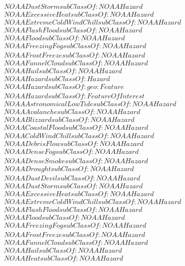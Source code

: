 \begin{align}
  NOAADustStorm subClassOf: NOAAHazard\\
  NOAAExcessiveHeat subClassOf: NOAAHazard\\
  NOAAExtremeColdWindChill subClassOf: NOAAHazard\\
  NOAAFlashFlood subClassOf: NOAAHazard\\
  NOAAFlood subClassOf: NOAAHazard\\
  NOAAFreezingFog subClassOf: NOAAHazard\\
  NOAAFrostFreeze subClassOf: NOAAHazard\\
  NOAAFunnelCloud subClassOf: NOAAHazard\\
  NOAAHail subClassOf: NOAAHazard\\
  NOAAHazard subClassOf: Hazard\\
  NOAAHazard subClassOf: geo:Feature\\
  NOAAHazard subClassOf: FeatureOfInterest\\
  NOAAAstronomicalLowTide subClassOf: NOAAHazard\\
  NOAAAvalanche subClassOf: NOAAHazard\\
  NOAABlizzard subClassOf: NOAAHazard\\
  NOAACoastalFlood subClassOf: NOAAHazard\\
  NOAAColdWindChill subClassOf: NOAAHazard\\
  NOAADebrisFlow subClassOf: NOAAHazard\\
  NOAADenseFog subClassOf: NOAAHazard\\
  NOAADenseSmoke subClassOf: NOAAHazard\\
  NOAADrought subClassOf: NOAAHazard\\
  NOAADustDevil subClassOf: NOAAHazard\\
  NOAADustStorm subClassOf: NOAAHazard\\
  NOAAExcessiveHeat subClassOf: NOAAHazard\\
  NOAAExtremeColdWindChill subClassOf: NOAAHazard\\
  NOAAFlashFlood subClassOf: NOAAHazard\\
  NOAAFlood subClassOf: NOAAHazard\\
  NOAAFreezingFog subClassOf: NOAAHazard\\
  NOAAFrostFreeze subClassOf: NOAAHazard\\
  NOAAFunnelCloud subClassOf: NOAAHazard\\
  NOAAHail subClassOf: NOAAHazard\\
  NOAAHeat subClassOf: NOAAHazard\\

\end{align}
